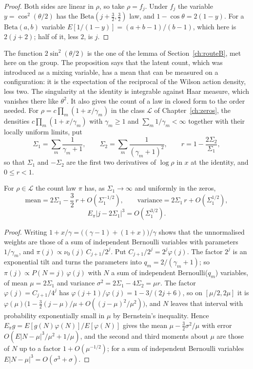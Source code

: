 \begin{proof}
Both sides are linear in $\rho$, so take $\rho=f_j$. Under $f_j$ the variable $y=\cos^2(\theta/2)$ has the $\mathrm{Beta}(j+\frac32,\frac32)$ law, and $1-\cos\theta=2(1-y)$. For a $\mathrm{Beta}(a,b)$ variable $E[1/(1-y)]=(a+b-1)/(b-1)$, which here is $2(j+2)$; half of it, less $2$, is $j$.
\end{proof}

The function $2\sin^2(\theta/2)$ is the one of the lemma of Section~\ref{ch:routeB}, met here on the group. The proposition says that the latent count, which was introduced as a mixing variable, has a mean that can be measured on a configuration: it is the expectation of the reciprocal of the Wilson action density, less two. The singularity at the identity is integrable against Haar measure, which vanishes there like $\theta^2$. It also gives the count of a law in closed form to the order needed. For $\rho=c\prod_m(1+x/\gamma_m)$ in the class $\mathcal L$ of Chapter~\ref{ch:zeros}, the densities $c\prod_m(1+x/\gamma_m)$ with $\gamma_m\ge1$ and $\sum_m1/\gamma_m<\infty$ together with their locally uniform limits, put
\[
\Sigma_1=\sum_m\frac1{\gamma_m+1},\qquad \Sigma_2=\sum_m\frac1{(\gamma_m+1)^2},\qquad r=1-\frac{2\Sigma_2}{\Sigma_1},
\]
so that $\Sigma_1$ and $-\Sigma_2$ are the first two derivatives of $\log\rho$ in $x$ at the identity, and $0\le r<1$.

\begin{lemma}\label{lem:Lcount}
For $\rho\in\mathcal L$ the count law $\pi$ has, as $\Sigma_1\to\infty$ and uniformly in the zeros,
\[
\text{mean}=2\Sigma_1-\frac32\,r+O(\Sigma_1^{-1/2}),\qquad \text{variance}=2\Sigma_1\,r+O(\Sigma_1^{1/2}),
\]
\[
E_\pi|j-2\Sigma_1|^3=O(\Sigma_1^{3/2}).
\]
\end{lemma}

\begin{proof}
Writing $1+x/\gamma=\big((\gamma-1)+(1+x)\big)/\gamma$ shows that the unnormalised weights are those of a sum of independent Bernoulli variables with parameters $1/\gamma_m$, and $\pi(j)\propto\nu_0(j)\,C_{j+1}/2^j$. Put $C_{j+1}/2^j=2^j\varphi(j)$. The factor $2^j$ is an exponential tilt and turns the parameters into $q_m=2/(\gamma_m+1)$; so $\pi(j)\propto P(N=j)\,\varphi(j)$ with $N$ a sum of independent Bernoulli($q_m$) variables, of mean $\mu=2\Sigma_1$ and variance $\sigma^2=2\Sigma_1-4\Sigma_2=\mu r$. The factor $\varphi(j)=C_{j+1}/4^j$ has $\varphi(j+1)/\varphi(j)=1-3/(2j+6)$, so on $[\mu/2,2\mu]$ it is $\varphi(\mu)\big(1-\frac32(j-\mu)/\mu+O((j-\mu)^2/\mu^2)\big)$, and $N$ leaves that interval with probability exponentially small in $\mu$ by Bernstein's inequality. Hence $E_\pi g=E[g(N)\varphi(N)]/E[\varphi(N)]$ gives the mean $\mu-\frac32\sigma^2/\mu$ with error $O(E|N-\mu|^3/\mu^2+1/\mu)$, and the second and third moments about $\mu$ are those of $N$ up to a factor $1+O(\mu^{-1/2})$; for a sum of independent Bernoulli variables $E|N-\mu|^3=O(\sigma^3+\sigma)$.
\end{proof}

